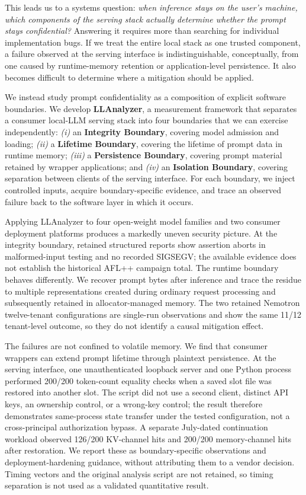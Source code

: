 \documentclass[journal,tifs]{IEEEtran}
\begin{document}
This leads us to a systems question: \emph{when inference stays on the user's machine, which components of the serving stack actually determine whether the prompt stays confidential?} Answering it requires more than searching for individual implementation bugs. If we treat the entire local stack as one trusted component, a failure observed at the serving interface is indistinguishable, conceptually, from one caused by runtime-memory retention or application-level persistence. It also becomes difficult to determine where a mitigation should be applied.

We instead study prompt confidentiality as a composition of explicit software boundaries. We develop \textbf{LLAnalyzer}, a measurement framework that separates a consumer local-LLM serving stack into four boundaries that we can exercise independently: \emph{(i)} an \textbf{Integrity Boundary}, covering model admission and loading; \emph{(ii)} a \textbf{Lifetime Boundary}, covering the lifetime of prompt data in runtime memory; \emph{(iii)} a \textbf{Persistence Boundary}, covering prompt material retained by wrapper applications; and \emph{(iv)} an \textbf{Isolation Boundary}, covering separation between clients of the serving interface. For each boundary, we inject controlled inputs, acquire boundary-specific evidence, and trace an observed failure back to the software layer in which it occurs.

Applying LLAnalyzer to four open-weight model families and two consumer deployment platforms produces a markedly uneven security picture. At the integrity boundary, retained structured reports show assertion aborts in malformed-input testing and no recorded SIGSEGV; the available evidence does not establish the historical AFL++ campaign total. The runtime boundary behaves differently. We recover prompt bytes after inference and trace the residue to multiple representations created during ordinary request processing and subsequently retained in allocator-managed memory. The two retained Nemotron twelve-tenant configurations are single-run observations and show the same 11/12 tenant-level outcome, so they do not identify a causal mitigation effect.

The failures are not confined to volatile memory. We find that consumer wrappers can extend prompt lifetime through plaintext persistence. At the serving interface, one unauthenticated loopback server and one Python process performed 200/200 token-count equality checks when a saved slot file was restored into another slot. The script did not use a second client, distinct API keys, an ownership control, or a wrong-key control; the result therefore demonstrates same-process state transfer under the tested configuration, not a cross-principal authorization bypass. A separate July-dated continuation workload observed 126/200 KV-channel hits and 200/200 memory-channel hits after restoration. We report these as boundary-specific observations and deployment-hardening guidance, without attributing them to a vendor decision. Timing vectors and the original analysis script are not retained, so timing separation is not used as a validated quantitative result.
\end{document}
